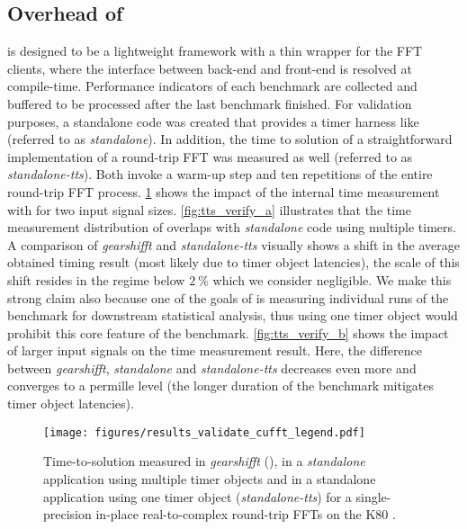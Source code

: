 \subsection{Overhead of \gearshifft{}}

\gearshifft{} is designed to be a lightweight framework with a thin wrapper for the FFT clients, where the interface between back-end and front-end is resolved at compile-time. Performance indicators of each benchmark are collected and buffered to be processed after the last benchmark finished. For validation purposes, a \cufft{} standalone code \cite{gearshifft_github} was created that provides a timer harness like \gearshifft{} (referred to as \textit{standalone}). In addition, the time to solution of a straightforward implementation of a round-trip FFT was measured as well (referred to as \textit{standalone-tts}). Both invoke a warm-up step and ten repetitions of the entire round-trip FFT process. 
\cref{fig:verify_cufft} shows the impact of the \gearshifft{} internal time measurement with \cufft{} for two input signal sizes. \cref{fig:tts_verify_a} illustrates that the time measurement distribution of \gearshifft{} overlaps with \textit{standalone} code using multiple timers. A comparison of \textit{gearshifft} and \textit{standalone-tts} visually shows a shift in the average obtained timing result (most likely due to timer object latencies), the scale of this shift resides in the regime below $\SI{2}{\percent}$ which we consider negligible. We make this strong claim also because one of the goals of \gearshifft{} is measuring individual runs of the benchmark for downstream statistical analysis, thus using one timer object would prohibit this core feature of the benchmark. \cref{fig:tts_verify_b} shows the impact of larger input signals on the time measurement result. Here, the difference between \textit{gearshifft}, \textit{standalone}  and \textit{standalone-tts} decreases even more and converges to a permille level (the longer duration of the benchmark mitigates timer object latencies). 

\begin{figure}[!htb]
\vspace{-1em}
  \centering
  \texttt{[image: figures/results\_validate\_cufft\_legend.pdf]}\vspace{-1em}
  \hfill
  \caption{Time-to-solution measured in \textit{gearshifft} (\cufft{}), in a \textit{standalone} \cufft{} application using multiple timer objects and in a standalone application using one timer object (\textit{standalone-tts}) for a single-precision in-place real-to-complex round-trip FFTs on the K80 \cite{taurus}.}
  \label{fig:verify_cufft}
\end{figure}

